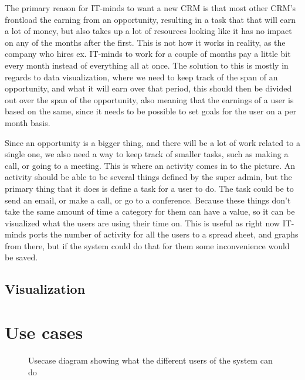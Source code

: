 The primary reason for IT-minds to want a new CRM is that most other CRM's frontload the earning from an opportunity, resulting in a task that that will earn a lot of money, but also takes up a lot of resources looking like it has no impact on any of the months after the first. This is not how it works in reality, as the company who hires ex. IT-minds to work for a couple of months pay a little bit every month instead of everything all at once. The solution to this is mostly in regards to data visualization, where we need to keep track of the span of an opportunity, and what it will earn over that period, this should then be divided out over the span of the opportunity, also meaning that the earnings of a user is based on the same, since it needs to be possible to set goals for the user on a per month basis.

Since an opportunity is a bigger thing, and there will be a lot of work related to a single one, we also need a way to keep track of smaller tasks, such as making a call, or going to a meeting. This is where an activity comes in to the picture. An activity should be able to be several things defined by the super admin, but the primary thing that it does is define a task for a user to do. The task could be to send an email, or make a call, or go to a conference. Because these things don't take the same amount of time a category for them can have a value, so it can be visualized what the users are using their time on. This is useful as right now IT-minds ports the number of activity for all the users to a spread sheet, and graphs from there, but if the system could do that for them some inconvenience would be saved.

\subsection{Visualization}
\label{sub:Visualization}

\section{Use cases}
\label{sec:Use cases}

\begin{figure}
  \caption{Usecase diagram showing what the different users of the system can do}
  \label{fig:usecase}
\end{figure}

